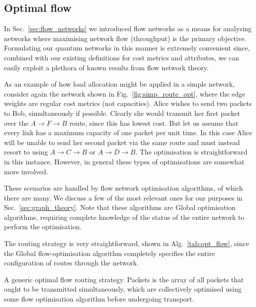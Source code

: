 \documentclass[aps,rmp,twocolumn,amsmath,amssymb,nofootinbib,superscriptaddress]{revtex4}
\begin{document}
\subsection{Optimal flow}

In Sec.~\ref{sec:flow_networks} we introduced flow networks as a means for analysing networks where maximising network flow (throughput) is the primary objective. Formulating our quantum networks in this manner is extremely convenient since, combined with our existing definitions for cost metrics and attributes, we can easily exploit a plethora of known results from flow network theory.

As an example of how load allocation might be applied in a simple network, consider again the network shown in Fig.~\ref{fig:simp_route_opt}, where the edge weights are regular cost metrics (not capacities). Alice wishes to send two packets to Bob, simultaneously if possible. Clearly she would transmit her first packet over the \mbox{$A\to F\to B$} route, since this has lowest cost. But let us assume that every link has a maximum capacity of one packet per unit time. In this case Alice will be unable to send her second packet via the same route and must instead resort to using \mbox{$A\to C \to B$} or \mbox{$A\to D\to B$}. The optimisation is straightforward in this instance. However, in general these types of optimisations are somewhat more involved.

These scenarios are handled by flow network optimisation algorithms, of which there are many. We discuss a few of the most relevant ones for our purposes in Sec.~\ref{sec:graph_theory}. Note that these algorithms are {\sc Global} optimisation algorithms, requiring complete knowledge of the status of the entire network to perform the optimisation.

The routing strategy is very straightforward, shown in Alg.~\ref{tab:opt_flow}, since the {\sc Global} flow-optimisation algorithm completely specifies the entire configuration of routes through the network.

\begin{table}[!htb]
\caption{A generic optimal flow routing strategy. {\sc Packets} is the array of all packets that ought to be transmitted simultaneously, which are collectively optimised using some flow optimisation algorithm before undergoing transport.} \label{tab:opt_flow}
\end{table}
\end{document}
